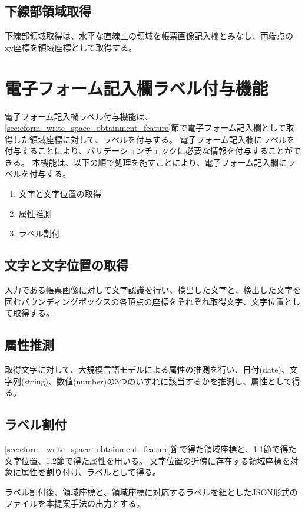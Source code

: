 \subsection{下線部領域取得}\label{subsec:underline_coords_obtainment}
下線部領域取得は、水平な直線上の領域を帳票画像記入欄とみなし、両端点のxy座標を領域座標として取得する。


\section{電子フォーム記入欄ラベル付与機能}\label{sec:label_link}
電子フォーム記入欄ラベル付与機能は、\ref{sec:eform_write_space_obtainment_feature}節で電子フォーム記入欄として取得した領域座標に対して、ラベルを付与する。
電子フォーム記入欄にラベルを付与することにより、バリデーションチェックに必要な情報を付与することができる。
本機能は、以下の順で処理を施すことにより、電子フォーム記入欄にラベルを付与する。

\begin{enumerate}
  \item 文字と文字位置の取得
  \item 属性推測
  \item ラベル割付
\end{enumerate}

\subsection{文字と文字位置の取得}\label{subsec:char_and_bbox_obtainment}
入力である帳票画像に対して文字認識を行い、検出した文字と、検出した文字を囲むバウンディングボックスの各頂点の座標をそれぞれ取得文字、文字位置として取得する。

\subsection{属性推測}\label{subsec:att_prediction}
取得文字に対して、大規模言語モデルによる属性の推測を行い、日付(date)、文字列(string)、数値(number)の3つのいずれに該当するかを推測し、属性として得る。

\subsection{ラベル割付}\label{subsec:label_link}
\ref{sec:eform_write_space_obtainment_feature}節で得た領域座標と、\ref{subsec:char_and_bbox_obtainment}節で得た文字位置、\ref{subsec:att_prediction}節で得た属性を用いる。
文字位置の近傍に存在する領域座標を対象に属性を割り付け、ラベルとして得る。

ラベル割付後、領域座標と、領域座標に対応するラベルを組としたJSON形式のファイルを本提案手法の出力とする。

